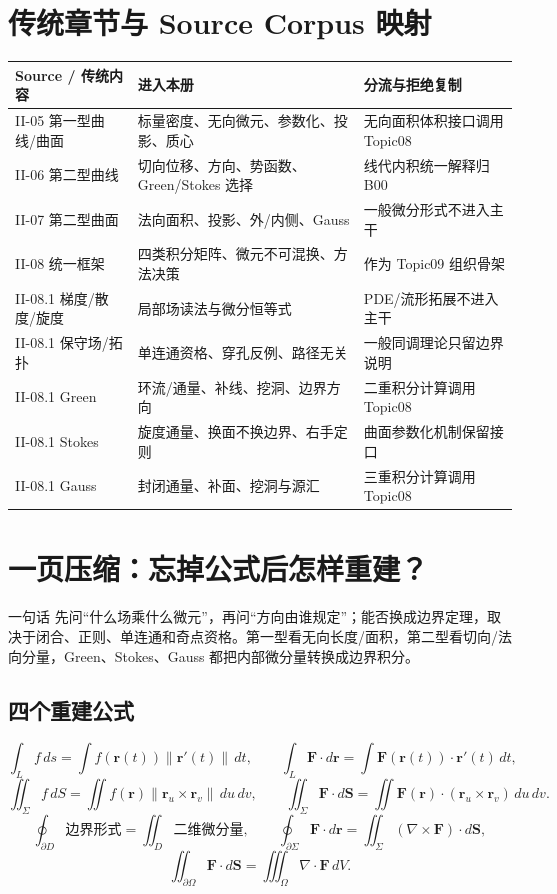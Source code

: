 \documentclass[11pt,a4paper,fontset=fandol]{ctexart}
\begin{document}
\section{传统章节与 Source Corpus 映射}
\begin{longtable}{L{2.75cm}L{5.15cm}L{\dimexpr\linewidth-7.90cm\relax}}
\toprule
\textbf{Source / 传统内容} & \textbf{进入本册} & \textbf{分流与拒绝复制}\\
\midrule
II-05 第一型曲线/曲面 & 标量密度、无向微元、参数化、投影、质心 & 无向面积体积接口调用 Topic08\\
II-06 第二型曲线 & 切向位移、方向、势函数、Green/Stokes 选择 & 线代内积统一解释归 B00\\
II-07 第二型曲面 & 法向面积、投影、外/内侧、Gauss & 一般微分形式不进入主干\\
II-08 统一框架 & 四类积分矩阵、微元不可混换、方法决策 & 作为 Topic09 组织骨架\\
II-08.1 梯度/散度/旋度 & 局部场读法与微分恒等式 & PDE/流形拓展不进入主干\\
II-08.1 保守场/拓扑 & 单连通资格、穿孔反例、路径无关 & 一般同调理论只留边界说明\\
II-08.1 Green & 环流/通量、补线、挖洞、边界方向 & 二重积分计算调用 Topic08\\
II-08.1 Stokes & 旋度通量、换面不换边界、右手定则 & 曲面参数化机制保留接口\\
II-08.1 Gauss & 封闭通量、补面、挖洞与源汇 & 三重积分计算调用 Topic08\\
\bottomrule
\end{longtable}

\section{一页压缩：忘掉公式后怎样重建？}
\begin{corebox}{一句话}
先问“什么场乘什么微元”，再问“方向由谁规定”；能否换成边界定理，取决于闭合、正则、单连通和奇点资格。第一型看无向长度/面积，第二型看切向/法向分量，Green、Stokes、Gauss 都把内部微分量转换成边界积分。
\end{corebox}

\subsection{四个重建公式}
\[
\int_L f\,ds=\int f(\mathbf r(t))\lVert\mathbf r'(t)\rVert\,dt,
\qquad
\int_L\mathbf F\cdot d\mathbf r=\int\mathbf F(\mathbf r(t))\cdot\mathbf r'(t)\,dt,
\]
\[
\iint_\Sigma f\,dS=\iint f(\mathbf r)\lVert\mathbf r_u\times\mathbf r_v\rVert\,du\,dv,
\qquad
\iint_\Sigma\mathbf F\cdot d\mathbf S=\iint\mathbf F(\mathbf r)\cdot(\mathbf r_u\times\mathbf r_v)\,du\,dv.
\]
\[
\oint_{\partial D}\text{边界形式}=\iint_D\text{二维微分量},
\qquad
\oint_{\partial\Sigma}\mathbf F\cdot d\mathbf r=\iint_\Sigma(\nabla\times\mathbf F)\cdot d\mathbf S,
\]
\[
\iint_{\partial\Omega}\mathbf F\cdot d\mathbf S=\iiint_\Omega\nabla\cdot\mathbf F\,dV.
\]
\end{document}
